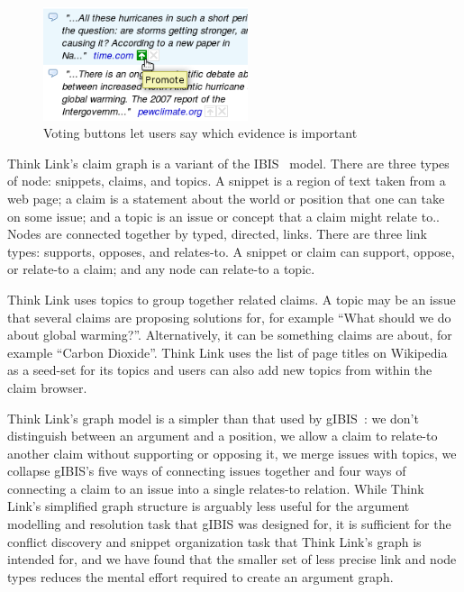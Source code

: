 \documentclass{chi2009}
\newcommand{\todo}[1]{}
\begin{document}
\begin{figure}[tb]
	\begin{center}
	\includegraphics[width=6cm]{../screenshots/v2_vote.png}
	\caption{Voting buttons let users say which evidence is important}
	\label{voting}
	\end{center}
\end{figure}


Think Link's claim graph is a variant of the IBIS~\cite{Rittel1973} model. There are three types of node: snippets, claims, and topics. A snippet is a region of text taken from a web page; a claim is a statement about the world or position that one can take on some issue; and a topic is an issue or concept that a claim might relate to.. Nodes are connected together by typed, directed, links. There are three link types: supports, opposes, and relates-to. A snippet or claim can support, oppose, or relate-to a claim; and any node can relate-to a topic. 

Think Link uses topics to group together related claims. A topic may be an issue that several claims are proposing solutions for, for example ``What should we do about global warming?''. Alternatively, it can be something claims are about, for example ``Carbon Dioxide''. Think Link uses the list of page titles on Wikipedia as a seed-set for its topics and users can also add new topics from within the claim browser.

Think Link's graph model is a simpler than that used by gIBIS~\cite{Conklin1987}: we don't distinguish between an argument and a position, we allow a claim to relate-to another claim without supporting or opposing it, we merge issues with topics, we collapse gIBIS's five ways of connecting issues together and four ways of connecting a claim to an issue into a single relates-to relation. While Think Link's simplified graph structure is arguably less useful for the argument modelling and resolution task that gIBIS was designed for, it is sufficient for the conflict discovery and snippet organization task that Think Link's graph is intended for, and we have found that the smaller set of less precise link and node types reduces the mental effort required to create an argument graph.
\end{document}

